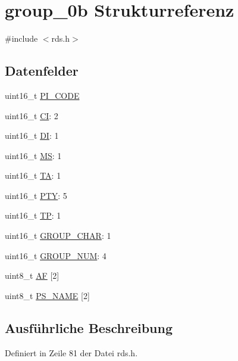 \hypertarget{structgroup__0b}{}\section{group\+\_\+0b Strukturreferenz}
\label{structgroup__0b}


{\ttfamily \#include $<$rds.\+h$>$}

\subsection*{Datenfelder}
\begin{DoxyCompactItemize}
\item 
uint16\+\_\+t \hyperlink{structgroup__0b_a5cd9b1f6413028425796c1129aa8fd87}{P\+I\+\_\+\+C\+O\+D\+E}
\item 
uint16\+\_\+t \hyperlink{structgroup__0b_aa6fd8556e02ce89fed23057f1cb37e44}{C\+I}\+: 2
\item 
uint16\+\_\+t \hyperlink{structgroup__0b_ad020d0abff338c9c34924a44478ac591}{D\+I}\+: 1
\item 
uint16\+\_\+t \hyperlink{structgroup__0b_a0d87191040df43fdd9f67487d0cc1a45}{M\+S}\+: 1
\item 
uint16\+\_\+t \hyperlink{structgroup__0b_a6de7751205cef4ffcce610399a030892}{T\+A}\+: 1
\item 
uint16\+\_\+t \hyperlink{structgroup__0b_a0474967478fbbc2c71b800d2e0132d45}{P\+T\+Y}\+: 5
\item 
uint16\+\_\+t \hyperlink{structgroup__0b_ab9e634c63b0d95a96716d5f6d7f06d72}{T\+P}\+: 1
\item 
uint16\+\_\+t \hyperlink{structgroup__0b_a66d4119990dc4c3e040a43885e9bb953}{G\+R\+O\+U\+P\+\_\+\+C\+H\+A\+R}\+: 1
\item 
uint16\+\_\+t \hyperlink{structgroup__0b_a9f692e9f76ee88348d426bcd4e9bc70b}{G\+R\+O\+U\+P\+\_\+\+N\+U\+M}\+: 4
\item 
uint8\+\_\+t \hyperlink{structgroup__0b_ae5a8515ae995b21e542b2ad52b20c34e}{A\+F} \mbox{[}2\mbox{]}
\item 
uint8\+\_\+t \hyperlink{structgroup__0b_a80447425671c19133df16d620705bb09}{P\+S\+\_\+\+N\+A\+M\+E} \mbox{[}2\mbox{]}
\end{DoxyCompactItemize}


\subsection{Ausführliche Beschreibung}


Definiert in Zeile 81 der Datei rds.\+h.



